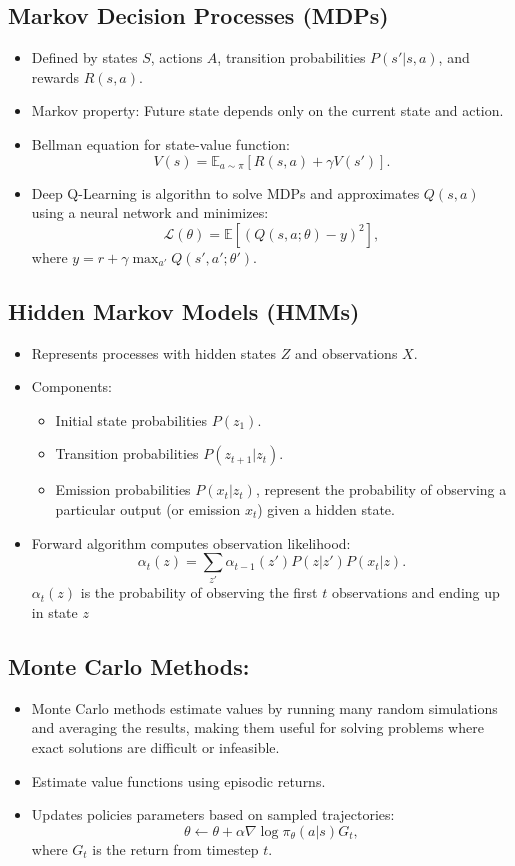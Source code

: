 \documentclass[12pt,a4paper]{article}
\begin{document}
\subsection{Markov Decision Processes (MDPs)}
\begin{itemize}
    \item Defined by states $S$, actions $A$, transition probabilities $P(s'|s, a)$, and rewards $R(s, a)$.
    \item Markov property: Future state depends only on the current state and action.
    \item Bellman equation for state-value function:
    \[ V(s) = \mathbb{E}_{a \sim \pi}[R(s, a) + \gamma V(s')]. \]
    \item Deep Q-Learning is algorithn to solve MDPs and approximates $Q(s, a)$ using a neural network and minimizes:
    \[ \mathcal{L}(\theta) = \mathbb{E}[(Q(s, a; \theta) - y)^2], \]
    where $y = r + \gamma \max_{a'} Q(s', a'; \theta').$
\end{itemize}

\subsection{Hidden Markov Models (HMMs)}
\begin{itemize}
    \item Represents processes with hidden states $Z$ and observations $X$.
    \item Components:
    \begin{itemize}
        \item Initial state probabilities $P(z_1)$.
        \item Transition probabilities $P(z_{t+1}|z_t)$.
        \item Emission probabilities $P(x_t|z_t)$, represent the probability of observing a particular output (or emission $x_t$) given a hidden state.
    \end{itemize}
    \item Forward algorithm computes observation likelihood:
    \[ \alpha_t(z) = \sum_{z'} \alpha_{t-1}(z') P(z|z') P(x_t|z). \]
    $\alpha_t(z)$ is the probability of observing the first  $t$ observations and ending up in state $z$
\end{itemize}

\subsection{Monte Carlo Methods:}
    \begin{itemize}
    \item Monte Carlo methods estimate values by running many random simulations and averaging the results, making them useful for solving problems where exact solutions are difficult or infeasible.
        \item Estimate value functions using episodic returns.
        \item Updates policies parameters based on sampled trajectories:
        \[ \theta \leftarrow \theta + \alpha \nabla \log \pi_\theta(a|s) G_t, \]
        where $G_t$ is the return from timestep $t$.
    \end{itemize}
\end{document}
